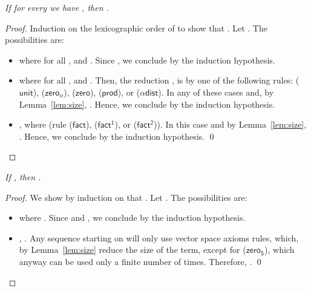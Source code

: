 \documentclass[preprint]{elsarticle}
\newcommand\recap[3]{\noindent {\bf #1 \ref{#2}.} \emph{#3}}
\newcommand\s[1]{\ensuremath{\mathsf{#1}}}
\newcommand\runit{(\s{unit})}
\newcommand\rzeros{(\s{zero_\alpha})}
\newcommand\rzero{(\s{zero})}
\newcommand\rzeroS{(\s{zero_S})}
\newcommand\rprod{(\s{prod})}
\newcommand\rdists{(\s{\alpha dist})}
\newcommand\rfact{(\s{fact})}
\newcommand\rfacto{(\s{fact^1})}
\newcommand\rfactt{(\s{fact^2})}
\begin{document}
\recap{Lemma}{lem:ri_in_snset_implies_sum_ri_in_snset}{
  If for every  we have ,
  then .
}
\begin{proof}
  Induction on the lexicographic order of  to show that . Let .
  The possibilities are:
  \begin{itemize}
  \item  where for all ,  and . Since , we conclude by the induction
    hypothesis.
  \item  where for all ,  and .
    Then, the reduction , is by one of the following
    rules: \runit, \rzeros, \rzero, \rprod, or \rdists.
    In any of these cases  and, by Lemma~\ref{lem:size}, . Hence, we conclude by the induction
    hypothesis.
  \item , where  (rule
    \rfact, \rfacto, or \rfactt). In this case  and by Lemma~\ref{lem:size},
    . Hence, we conclude by the
    induction hypothesis. \qed
  \end{itemize}
\end{proof}

\recap{Lemma}{lem:t_implies_proj_t}{
  If , then .
}
\begin{proof}
  We show by induction on  that .
  Let . The possibilities are:
  \begin{itemize}
  \item  where . Since 
    and , we conclude by the induction hypothesis.
  \item , .
    Any sequence starting on  will only use vector space axioms rules, which,
    by Lemma~\ref{lem:size} reduce the size of the term, except for
    \rzeroS, which anyway can be used only a finite number of times. Therefore, .
    \qed
  \end{itemize}
\end{proof}
\end{document}
